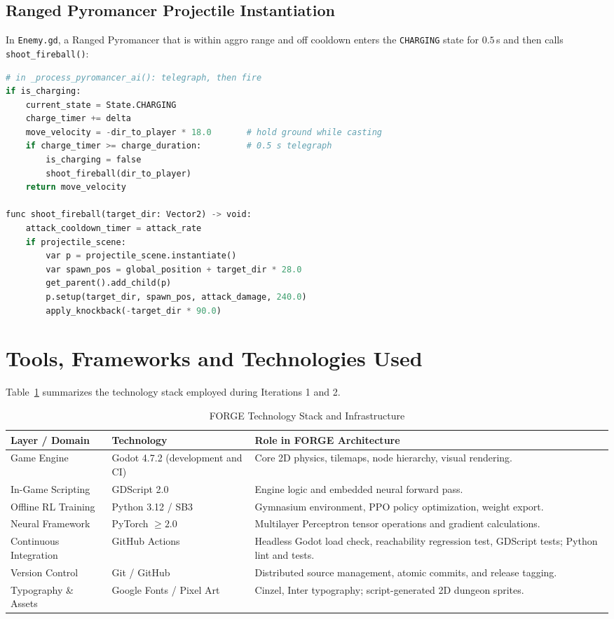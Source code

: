\subsection{Ranged Pyromancer Projectile Instantiation}
In \texttt{Enemy.gd}, a Ranged Pyromancer that is within aggro range and off cooldown enters the \texttt{CHARGING} state for $0.5$\,s and then calls \texttt{shoot\_fireball()}:
\begin{lstlisting}[language=Python, caption={Telegraphed Fireball Spawning in \texttt{Enemy.gd}}, label={lst:enemy_attack}]
# in _process_pyromancer_ai(): telegraph, then fire
if is_charging:
    current_state = State.CHARGING
    charge_timer += delta
    move_velocity = -dir_to_player * 18.0       # hold ground while casting
    if charge_timer >= charge_duration:         # 0.5 s telegraph
        is_charging = false
        shoot_fireball(dir_to_player)
    return move_velocity

func shoot_fireball(target_dir: Vector2) -> void:
    attack_cooldown_timer = attack_rate
    if projectile_scene:
        var p = projectile_scene.instantiate()
        var spawn_pos = global_position + target_dir * 28.0
        get_parent().add_child(p)
        p.setup(target_dir, spawn_pos, attack_damage, 240.0)
        apply_knockback(-target_dir * 90.0)
\end{lstlisting}

\section{Tools, Frameworks and Technologies Used}
Table~\ref{tab:tech_stack} summarizes the technology stack employed during Iterations 1 and 2.

\begin{table}[!htbp]
\centering
\caption{FORGE Technology Stack and Infrastructure}
\label{tab:tech_stack}
\small
\begin{tabular}{p{}p{}p{}}
\toprule
\textbf{Layer / Domain} & \textbf{Technology} & \textbf{Role in FORGE Architecture} \\
\midrule
Game Engine & Godot 4.7.2 (development and CI) & Core 2D physics, tilemaps, node hierarchy, visual rendering. \\
In-Game Scripting & GDScript 2.0 & Engine logic and embedded neural forward pass. \\
Offline RL Training & Python 3.12 / SB3 & Gymnasium environment, PPO policy optimization, weight export. \\
Neural Framework & PyTorch $\ge 2.0$ & Multilayer Perceptron tensor operations and gradient calculations. \\
Continuous Integration & GitHub Actions & Headless Godot load check, reachability regression test, GDScript tests; Python lint and tests. \\
Version Control & Git / GitHub & Distributed source management, atomic commits, and release tagging. \\
Typography \& Assets & Google Fonts / Pixel Art & Cinzel, Inter typography; script-generated 2D dungeon sprites. \\
\bottomrule
\end{tabular}
\end{table}

